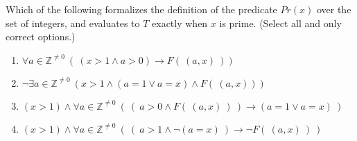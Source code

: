 
Which of the following formalizes the definition of the predicate
$Pr(x)$ over the set of integers, and evaluates to $T$ exactly when 
$x$ is prime. (Select all and only correct options.)

\begin{enumerate}
    \item $\forall a \in \mathbb{Z}^{\neq 0}~( ~(x > 1 \land a >0) \to F(~(a,x)~))$
    \item $\lnot \exists a \in \mathbb{Z}^{\neq 0} ~(x > 1 \land (a=1 \lor a=x) \land F(~(a,x)))$
    \item $(x > 1) \land \forall a \in \mathbb{Z}^{\neq 0}~( ~(~ a>0 \land F(~(a,x)~)~) \to (a=1 \lor a=x)~)$
    \item $(x > 1) \land \forall a \in \mathbb{Z}^{\neq 0}~( ~(~ a>1 \land \lnot (a=x) ~) \to \lnot F(~(a,x)~)~)$
\end{enumerate}
